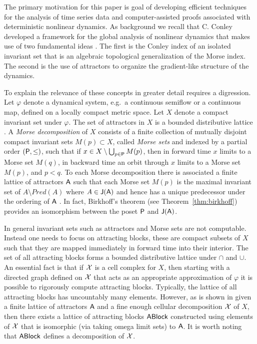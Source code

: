 The primary motivation for this paper is goal of developing efficient techniques for the analysis of time series data and computer-assisted proofs associated with deterministic nonlinear dynamics.
As background we recall that C. Conley developed a framework for the global analysis of nonlinear dynamics that makes use of two fundamental ideas \cite{conley:cbms}.
The first is the Conley index of an isolated invariant set \cite{salamon, robbin:salamon:1, mrozek} that is an algebraic topological generalization of the Morse index. 
The second is the use of attractors to organize the gradient-like structure of the dynamics.

To explain the relevance of these concepts in greater detail requires a digression.
Let $\varphi$ denote a dynamical system, e.g.\ a continuous semiflow or a continuous map, defined on a locally compact metric space.
Let $X$ denote a compact invariant set under $\varphi$.
The set of attractors  in $X$ is a bounded distributive lattice \cite{lsa}.
A \emph{Morse decomposition} of $X$ consists of a finite collection of mutually disjoint compact invariant sets $M(p)\subset X$, called \emph{Morse sets} and indexed by a partial order $({\mathsf P},\leq)$, such that if $x\in X\setminus \bigcup_{p\in {\mathsf P}}M(p)$, then in forward time $x$ limits to a Morse set $M(q)$, in backward time an orbit through $x$ limits to a Morse set $M(p)$, and $p < q$.
To each Morse decomposition there is associated a finite lattice of attractors ${\mathsf A}$ such that each Morse set $M(p)$ is the maximal invariant set of $A\setminus Pred(A)$ where $A\in{\mathsf J}({\mathsf A})$ and hence has a unique predecessor under the ordering of ${\mathsf A}$ \cite{kalies:mischaikow:vandervorst:18}. 
In fact, Birkhoff's theorem (see Theorem~\ref{thm:birkhoff}) provides an isomorphism between the poset ${\mathsf P}$ and ${\mathsf J}({\mathsf A})$.

In general invariant sets such as attractors and Morse sets are not computable.
Instead one needs to focus on attracting blocks, these are compact subsets of $X$ such that they are mapped immediately in forward time into their interior.  
The set of all attracting blocks forms a bounded distributive lattice  under $\cap$ and $\cup$.
An essential fact is that if ${\mathcal X}$ is a cell complex for $X$, then starting with a directed graph defined on ${\mathcal X}$ that acts as an appropriate approximation of $\varphi$ it is possible to rigorously compute attracting blocks. 
Typically, the lattice of all attracting blocks has uncountably many elements.
However, as is shown in \cite{lsa} given a finite lattice of attractors ${\mathsf A}$ and a fine enough cellular decomposition ${\mathcal X}$ of $X$, then there exists a lattice of attracting blocks ${\mathsf{ ABlock}}$ constructed using elements of  ${\mathcal X}$ that is isomorphic (via taking omega limit sets) to ${\mathsf A}$.
It is worth noting that ${\mathsf{ ABlock}}$ defines a decomposition of ${\mathcal X}$.

